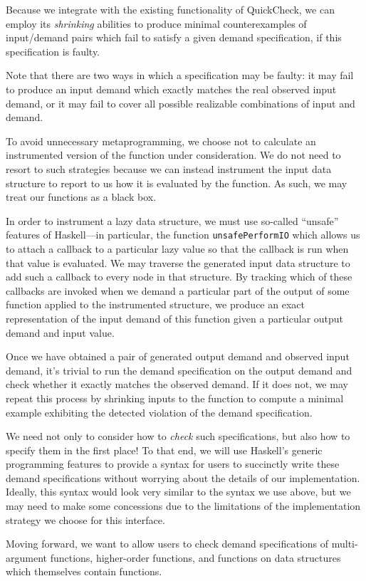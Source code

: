 \documentclass{article}
\begin{document}
Because we integrate with the existing functionality of QuickCheck, we
can employ its \emph{shrinking} abilities to produce minimal
counterexamples of input/demand pairs which fail to satisfy a given
demand specification, if this specification is faulty.

Note that there are two ways in which a specification may be faulty:
it may fail to produce an input demand which exactly matches the real
observed input demand, or it may fail to cover all possible realizable
combinations of input and demand.

To avoid unnecessary metaprogramming, we choose not to calculate an
instrumented version of the function under consideration. We do not
need to resort to such strategies because we can instead instrument
the input data structure to report to us how it is evaluated by the
function. As such, we may treat our functions as a black box.

In order to instrument a lazy data structure, we must use so-called
``unsafe'' features of Haskell---in particular, the function
\verb|unsafePerformIO| which allows us to attach a callback to a particular
lazy value so that the callback is run when that value is
evaluated. We may traverse the generated input data structure to add
such a callback to every node in that structure. By tracking which of
these callbacks are invoked when we demand a particular part of the
output of some function applied to the instrumented structure, we
produce an exact representation of the input demand of this function
given a particular output demand and input value.

Once we have obtained a pair of generated output demand and observed
input demand, it's trivial to run the demand specification on the
output demand and check whether it exactly matches the observed
demand. If it does not, we may repeat this process by shrinking inputs
to the function to compute a minimal example exhibiting the detected
violation of the demand specification.

We need not only to consider how to \emph{check} such specifications,
but also how to specify them in the first place! To that end, we will
use Haskell's generic programming features to provide a syntax for
users to succinctly write these demand specifications without worrying
about the details of our implementation. Ideally, this syntax would
look very similar to the syntax we use above, but we may need to make
some concessions due to the limitations of the implementation strategy
we choose for this interface.

Moving forward, we want to allow users to check demand specifications
of multi-argument functions, higher-order functions, and functions on
data structures which themselves contain functions.
\end{document}
